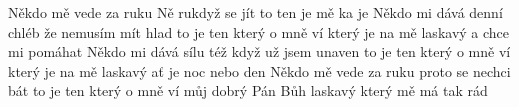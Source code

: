 \begin{TEXT}{Někdo mě vede za ruku}
\SLOKA Ně    rukdyž  se jít  \NL
to ten     je  mě ka\NL
je   
\SLOKA Někdo mi dává denní chléb že nemusím mít hlad \NL
to je ten který o mně ví který je na mě laskavý \NL
a chce mi pomáhat 
\SLOKA Někdo mi dává sílu též když už jsem unaven \NL
to je ten který o mně ví který je na mě laskavý \NL
ať je noc nebo den 
\SLOKA Někdo mě vede za ruku proto se nechci bát \NL
to je ten který o mně ví můj dobrý Pán Bůh laskavý \NL
který mě má tak rád \NL
\end{TEXT}
